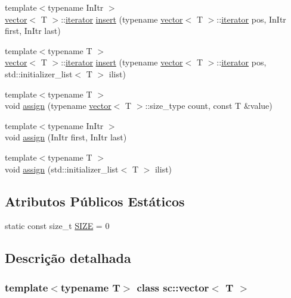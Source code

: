 \begin{DoxyCompactItemize}
{\footnotesize template$<$typename In\+Itr $>$ }\\\mbox{\hyperlink{classsc_1_1vector}{vector}}$<$ T $>$\+::\mbox{\hyperlink{classsc_1_1vector_1_1iterator}{iterator}} \mbox{\hyperlink{classsc_1_1vector_a774a81ea7131584862592c29a8137e28}{insert}} (typename \mbox{\hyperlink{classsc_1_1vector}{vector}}$<$ T $>$\+::\mbox{\hyperlink{classsc_1_1vector_1_1iterator}{iterator}} pos, In\+Itr first, In\+Itr last)
\item 
{\footnotesize template$<$typename T $>$ }\\\mbox{\hyperlink{classsc_1_1vector}{vector}}$<$ T $>$\+::\mbox{\hyperlink{classsc_1_1vector_1_1iterator}{iterator}} \mbox{\hyperlink{classsc_1_1vector_a4e59b7f5bc99a5436397426626719251}{insert}} (typename \mbox{\hyperlink{classsc_1_1vector}{vector}}$<$ T $>$\+::\mbox{\hyperlink{classsc_1_1vector_1_1iterator}{iterator}} pos, std\+::initializer\+\_\+list$<$ T $>$ ilist)
\item 
{\footnotesize template$<$typename T $>$ }\\void \mbox{\hyperlink{classsc_1_1vector_a6905779e8818b55d12ce46b75ab983d6}{assign}} (typename \mbox{\hyperlink{classsc_1_1vector}{vector}}$<$ T $>$\+::size\+\_\+type count, const T \&value)
\item 
{\footnotesize template$<$typename In\+Itr $>$ }\\void \mbox{\hyperlink{classsc_1_1vector_ab3e7f37e35c8a5206d069676540a2573}{assign}} (In\+Itr first, In\+Itr last)
\item 
{\footnotesize template$<$typename T $>$ }\\void \mbox{\hyperlink{classsc_1_1vector_a78760d9e3e005ed179947d12e2381103}{assign}} (std\+::initializer\+\_\+list$<$ T $>$ ilist)
\end{DoxyCompactItemize}
\subsection*{Atributos Públicos Estáticos}
\begin{DoxyCompactItemize}
\item 
static const size\+\_\+t \mbox{\hyperlink{classsc_1_1vector_a3fadfe198ea4c912fb9ce406ef366a6a}{S\+I\+ZE}} = 0
\end{DoxyCompactItemize}


\subsection{Descrição detalhada}
\subsubsection*{template$<$typename T$>$\newline
class sc\+::vector$<$ T $>$}

